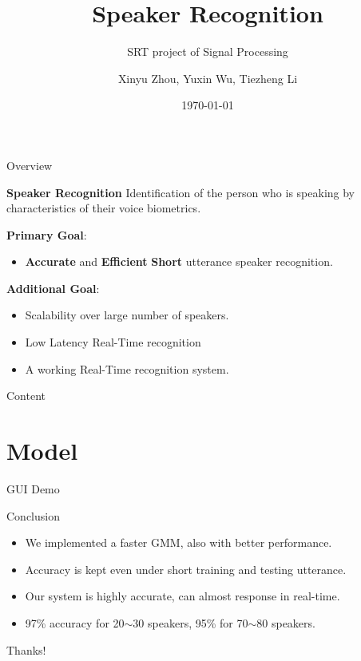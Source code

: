\documentclass {beamer}
\title{Speaker Recognition}
\subtitle{SRT project of Signal Processing}
\author {Xinyu Zhou, Yuxin Wu, Tiezheng Li}
\institute{
  Department of Computer Science and Technology\\
  Tsinghua University\\
}
\date{\today}
\theoremstyle{plain}
\begin{document}
\frame[plain]{\titlepage}

\begin{frame}{Overview}
\begin{exampleblock}{\textbf{Speaker Recognition}}
  Identification of the person who is speaking by characteristics of their voice biometrics.
\end{exampleblock}
\textbf{Primary Goal}:

\begin{itemize}
    \item \textbf{Accurate} and \textbf{Efficient} \textbf{Short} utterance speaker recognition.
\end{itemize}

\textbf{Additional Goal}:
\begin{itemize}
  \item Scalability over large number of speakers.
  \item Low Latency Real-Time recognition
  \item A working Real-Time recognition system.
\end{itemize}


\end{frame}
\begin{frame}{Content}
\tableofcontents
\end{frame}



\section{Model}


%
\begin{frame}{GUI Demo}

\end{frame}
\begin{frame}{Conclusion}
  \begin{itemize}
      \item We implemented a faster GMM, also with better performance.
      \item Accuracy is kept even under short training and testing utterance.
      \item Our system is highly accurate, can almost response in real-time.
      \item 97\% accuracy for 20$\sim$30 speakers, 95\% for 70$\sim$80 speakers.
  \end{itemize}
\end{frame}
\begin{frame}{}
  \begin{center}
  \Huge Thanks!
\end{center}
\end{frame}
\end{document}

